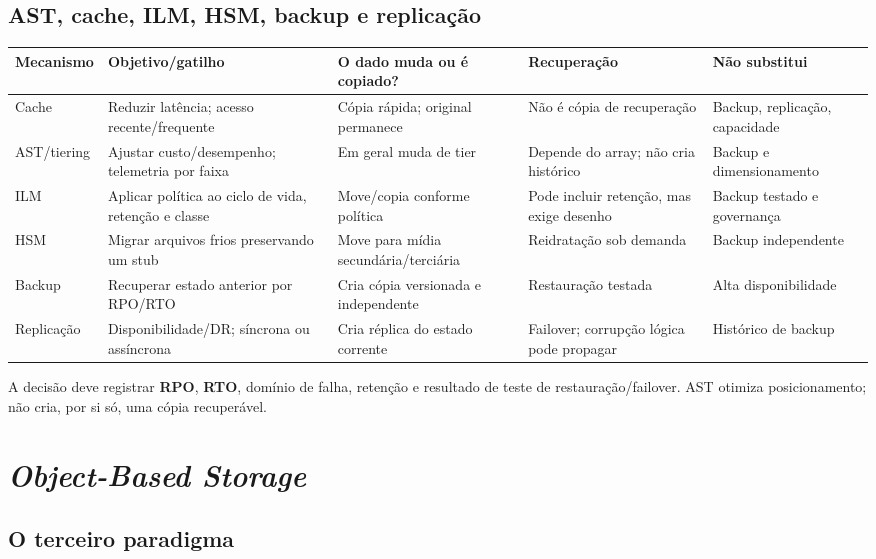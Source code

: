 \documentclass[11pt,a4paper]{article}
\begin{document}
\subsection{AST, cache, ILM, HSM, backup e replicação}

\begin{center}\footnotesize
\begin{tabular}{@{}p{2.2cm}p{3.1cm}p{3.2cm}p{3.2cm}p{3.3cm}@{}}
\toprule
\textbf{Mecanismo} & \textbf{Objetivo/gatilho} & \textbf{O dado muda ou é copiado?} &
\textbf{Recuperação} & \textbf{Não substitui} \\
\midrule
Cache & Reduzir latência; acesso recente/frequente & Cópia rápida; original permanece &
Não é cópia de recuperação & Backup, replicação, capacidade \\
AST/tiering & Ajustar custo/desempenho; telemetria por faixa & Em geral muda de tier &
Depende do array; não cria histórico & Backup e dimensionamento \\
ILM & Aplicar política ao ciclo de vida, retenção e classe & Move/copia conforme política &
Pode incluir retenção, mas exige desenho & Backup testado e governança \\
HSM & Migrar arquivos frios preservando um stub & Move para mídia secundária/terciária &
Reidratação sob demanda & Backup independente \\
Backup & Recuperar estado anterior por RPO/RTO & Cria cópia versionada e independente &
Restauração testada & Alta disponibilidade \\
Replicação & Disponibilidade/DR; síncrona ou assíncrona & Cria réplica do estado corrente &
Failover; corrupção lógica pode propagar & Histórico de backup \\
\bottomrule
\end{tabular}
\end{center}

\noindent A decisão deve registrar \textbf{RPO}, \textbf{RTO}, domínio de falha, retenção e
resultado de teste de restauração/failover. AST otimiza posicionamento; não cria, por si só,
uma cópia recuperável.

\section{\textit{Object-Based Storage}}
\label{sec:objeto}

\subsection{O terceiro paradigma}
\end{document}
